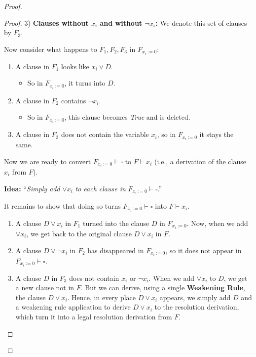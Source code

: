 \begin{proof}
\begin{proof}
  3) \textbf{Clauses without $x_i$ and without $\neg x_i$:}  
     We denote this set of clauses by $F_3$.

 

Now consider what happens to $ F_1, F_2, F_3$ in $F_{x_i := 0}$:

\begin{enumerate}
    \item A clause in $F_1$ looks like $x_i \lor D$.
    \begin{itemize}
        \item So in $F_{x_i := 0}$, it turns into $D$.
    \end{itemize}

    \item A clause in $F_2$ contains $\neg x_i$.
    \begin{itemize}
        \item So in $F_{x_i := 0}$, this clause becomes \textit{True} and is deleted.
    \end{itemize}

    \item A clause in $F_3$ does not contain the variable $x_i$, so in $F_{x_i := 0}$ it stays the same.
\end{enumerate}

Now we are ready to convert $F_{x_i := 0} \vdash \square$ to $F \vdash x_i$ (i.e., a derivation of the clause $x_i$ from $F$).

\begin{center}
\textbf{Idea:}
``\textit{Simply add} $ \lor x_i$ \textit{to each clause in} $F_{x_i := 0} \vdash \square$.''
\end{center}
 

It remains to show that doing so turns  
$F_{x_i := 0} \vdash \square$ into $F \vdash x_i$.

\begin{enumerate}
    \item   A clause $D \lor x_i$ in $F_1$ turned into the clause $D$ in $F_{x_i := 0}$.  
Now, when we add $\lor x_i$, we get back to the original clause $D \lor x_i$ in $F$.
 
    \item A clause $D \lor \neg x_i$ in $F_2$ has disappeared in $F_{x_i := 0}$, so it does not appear in $F_{x_i := 0} \vdash \square$.

    \item A clause $D$ in $F_3$ does not contain $x_i$ or $\neg x_i$. When we add $\lor x_i$ to $D$, we get a new clause not in $F$. But we can derive, using a single \textbf{Weakening Rule}, the clause $D \lor x_i$.  
Hence, in every place $D \lor x_i$ appears, we simply add $D$ and a weakening rule application to derive $D\lor x_i$ to the resolution derivation, which turn it into a legal resolution derivation from $F$.


\end{enumerate}
\end{proof}
\end{proof}
